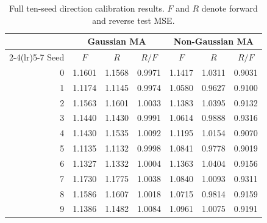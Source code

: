 
\begin{table}[t]
\centering
\caption{Full ten-seed direction calibration results. $F$ and $R$ denote forward and reverse test MSE.}
\label{tab:direction-calibration-seeds}
\small
\begin{tabular}{@{}rccc@{\qquad}ccc@{}}
\toprule
& \multicolumn{3}{c}{Gaussian MA} & \multicolumn{3}{c}{Non-Gaussian MA}\\
\cmidrule(lr){2-4}\cmidrule(lr){5-7}
Seed & $F$ & $R$ & $R/F$ & $F$ & $R$ & $R/F$\\
\midrule
0 & 1.1601 & 1.1568 & 0.9971 & 1.1417 & 1.0311 & 0.9031 \\
1 & 1.1174 & 1.1145 & 0.9974 & 1.0580 & 0.9627 & 0.9100 \\
2 & 1.1563 & 1.1601 & 1.0033 & 1.1383 & 1.0395 & 0.9132 \\
3 & 1.1440 & 1.1430 & 0.9991 & 1.0614 & 0.9888 & 0.9316 \\
4 & 1.1430 & 1.1535 & 1.0092 & 1.1195 & 1.0154 & 0.9070 \\
5 & 1.1135 & 1.1132 & 0.9998 & 1.0841 & 0.9778 & 0.9019 \\
6 & 1.1327 & 1.1332 & 1.0004 & 1.1363 & 1.0404 & 0.9156 \\
7 & 1.1730 & 1.1775 & 1.0038 & 1.0840 & 1.0093 & 0.9311 \\
8 & 1.1586 & 1.1607 & 1.0018 & 1.0715 & 0.9814 & 0.9159 \\
9 & 1.1386 & 1.1482 & 1.0084 & 1.0961 & 1.0075 & 0.9191 \\
\bottomrule
\end{tabular}
\end{table}
